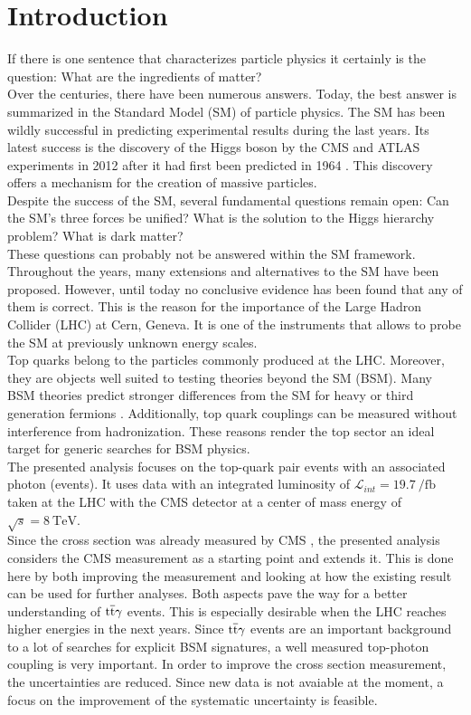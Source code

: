 \chapter{Introduction}

If there is one sentence that characterizes particle physics it certainly is the question: What are the ingredients of matter? \\
Over the centuries, there have been numerous answers. Today, the best answer is summarized in the Standard Model (SM) of particle physics. The SM has been wildly successful in predicting experimental results during the last years. Its latest success is the discovery of the Higgs boson by the CMS and ATLAS experiments in 2012 \cite{Aad:2012tfa,Chatrchyan:2012ufa} after it had first been predicted in 1964 \cite{Englert:1964et,Higgs:1964ia}. This discovery offers a mechanism for the creation of massive particles. \\
Despite the success of the SM, several fundamental questions remain open: Can the SM's three forces be unified? What is the solution to the Higgs hierarchy problem? What is dark matter? \\
These questions can probably not be answered within the SM framework. Throughout the years, many extensions and alternatives to the SM have been proposed. However, until today no conclusive evidence has been found that any of them is correct. This is the reason for the importance of the Large Hadron Collider (LHC) at Cern, Geneva. It is one of the instruments that allows to probe the SM at previously unknown energy scales. \\
Top quarks belong to the particles commonly produced at the LHC. Moreover, they are objects well suited to testing theories beyond the SM (BSM). Many BSM theories predict stronger differences from the SM for heavy or third generation fermions \cite{AguilarSaavedra:2008zc}. Additionally, top quark couplings can be measured without interference from hadronization. These reasons render the top sector an ideal target for generic searches for BSM physics. \\
The presented analysis focuses on the top-quark pair events with an associated photon (\ttgamma events). It uses data with an integrated luminosity of $\mathcal{L}_{int} = \SI{19.7}{\per \femto \barn}$ taken at the LHC with the CMS detector at a center of mass energy of $\sqrt{s} = \SI{8}{\tera \electronvolt}$. \\
Since the \ttgamma cross section was already measured by CMS \cite{CMS-PAS-TOP-13-011}, the presented analysis considers the CMS measurement as a starting point and extends it. This is done here by both improving the measurement and looking at how the existing result can be used for further analyses. Both aspects pave the way for a better understanding of $\mathrm{t}\overline{\mathrm{t}} \gamma$ events. This is especially desirable when the LHC reaches higher energies in the next years. Since $\mathrm{t}\overline{\mathrm{t}} \gamma$ events are an important background to a lot of searches for explicit BSM signatures, a well measured top-photon coupling is very important. In order to improve the \ttgamma cross section measurement, the uncertainties are reduced. Since new data is not avaiable at the moment, a focus on the improvement of the systematic uncertainty is feasible.\\
